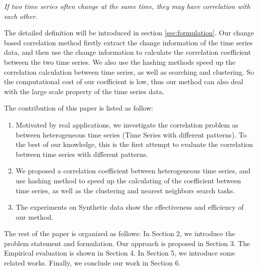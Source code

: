 
\textit{If two time series often change at the same time, they may have correlation with each other.}

The detailed definition will be introduced in section \ref{sec:formulation}.
Our change based correlation method firstly extract the change information of the time series data, and then use the change information to calculate the correlation coefficient between the two time series.
We also use the hashing methods speed up the correlation calculation between time series, as well as searching and clustering.
So the computational cost of our coefficient is low, thus our method can also deal with the large scale property of the time series data.

The contribution of this paper is listed as follow:
\begin{enumerate}
\item Motivated by real applications, we investigate the correlation
problem as between heterogeneous time series (Time Series with different patterns).
To the best of our knowledge, this is the first attempt
to evaluate the correlation between time series with different patterns.

\item We proposed a correlation coefficient between heterogeneous time series, and
use hashing method to speed up the calculating of the coefficient between time series, as well as the clustering and nearest neighbors search tasks.

\item The experiments on Synthetic data show the effectiveness and efficiency of our method.
\end{enumerate}

The rest of the paper is organized as follows: In Section 2, we introduce the problem
statement and formulation. Our approach is proposed in Section 3. The Empirical evaluation is shown in Section 4. In Section 5, we introduce some
related works. Finally, we conclude our work in Section 6.



